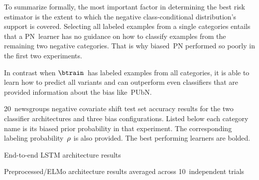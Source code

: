 To summarize formally, the most important factor in determining the best risk estimator is the extent to which the negative class-conditional distribution's support is covered.  Selecting all labeled examples from a single categories entails that a PN~learner has no guidance on how to classify examples from the remaining two negative categories.  That is why biased~PN performed so poorly in the first two experiments.

In contrast when $\btrain$~has labeled examples from all categories, it is able to learn how to predict all variants and can outperform even classifiers that are provided information about the bias like~PUbN.

\begin{table}[t]
  \caption{20~newsgroups negative covariate shift test set accuracy results for the two classifier architectures and three bias configurations. Listed below each category name is its biased prior probability in that experiment. The corresponding labeling probability~$\rho$ is also provided. The best performing learners are bolded.}\label{tab:ExperimentalResults}
  \begin{subtable}[t]{\textwidth}
    \centering
    \caption{End-to-end LSTM architecture results}\label{tab:ExperimentalResults:LSTM}
    
  \end{subtable}

  \begin{subtable}[t]{\textwidth}
    \centering
    \caption{Preprocessed\-/ELMo architecture results averaged across 10~independent trials}\label{tab:ExperimentalResults:ELMo}
    
  \end{subtable}
\end{table}
